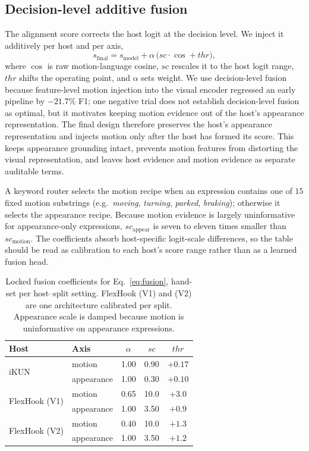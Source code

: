 \documentclass[sigconf,anonymous,nonacm]{acmart}
\begin{document}
\subsection{Decision-level additive fusion}
\label{sec:fusion}

The alignment score corrects the host logit at the decision level. We inject it additively per host and per axis,
\begin{equation}
s_{\mathrm{final}} = s_{\mathrm{model}} + \alpha\,\bigl(\mathit{sc}\cdot\cos + \mathit{thr}\bigr),
\label{eq:fusion}
\end{equation}
where $\cos$ is raw motion-language cosine, $\mathit{sc}$ rescales it to the host logit range, $\mathit{thr}$ shifts the operating point, and $\alpha$ sets weight. We use decision-level fusion because feature-level motion injection into the visual encoder regressed an early pipeline by $-21.7\%$ F1; one negative trial does not establish decision-level fusion as optimal, but it motivates keeping motion evidence out of the host's appearance representation. The final design therefore preserves the host's appearance representation and injects motion only after the host has formed its score. This keeps appearance grounding intact, prevents motion features from distorting the visual representation, and leaves host evidence and motion evidence as separate auditable terms.

A keyword router selects the motion recipe when an expression contains one of $15$ fixed motion substrings (e.g.\ \emph{moving}, \emph{turning}, \emph{parked}, \emph{braking}); otherwise it selects the appearance recipe. Because motion evidence is largely uninformative for appearance-only expressions, $\mathit{sc}_{\mathrm{appear}}$ is seven to eleven times smaller than $\mathit{sc}_{\mathrm{motion}}$. The coefficients absorb host-specific logit-scale differences, so the table should be read as calibration to each host's score range rather than as a learned fusion head.

\begin{table}[t]
\centering
\caption{Locked fusion coefficients for Eq.~\ref{eq:fusion}, hand-set per host--split setting. FlexHook (V1) and (V2) are one architecture calibrated per split. Appearance scale is damped because motion is uninformative on appearance expressions.}
\label{tab:recipe}
\small
\begin{tabular}{llccc}
\toprule
Host & Axis & $\alpha$ & $\mathit{sc}$ & $\mathit{thr}$ \\
\midrule
\multirow{2}{*}{iKUN}        & motion     & 1.00 & 0.90 & $+0.17$ \\
                             & appearance & 1.00 & 0.30 & $+0.10$ \\
\midrule
\multirow{2}{*}{FlexHook (V1)} & motion     & 0.65 & 10.0 & $+3.0$  \\
                             & appearance & 1.00 & 3.50 & $+0.9$  \\
\midrule
\multirow{2}{*}{FlexHook (V2)} & motion     & 0.40 & 10.0 & $+1.3$  \\
                             & appearance & 1.00 & 3.50 & $+1.2$  \\
\bottomrule
\end{tabular}
\end{table}
\end{document}
